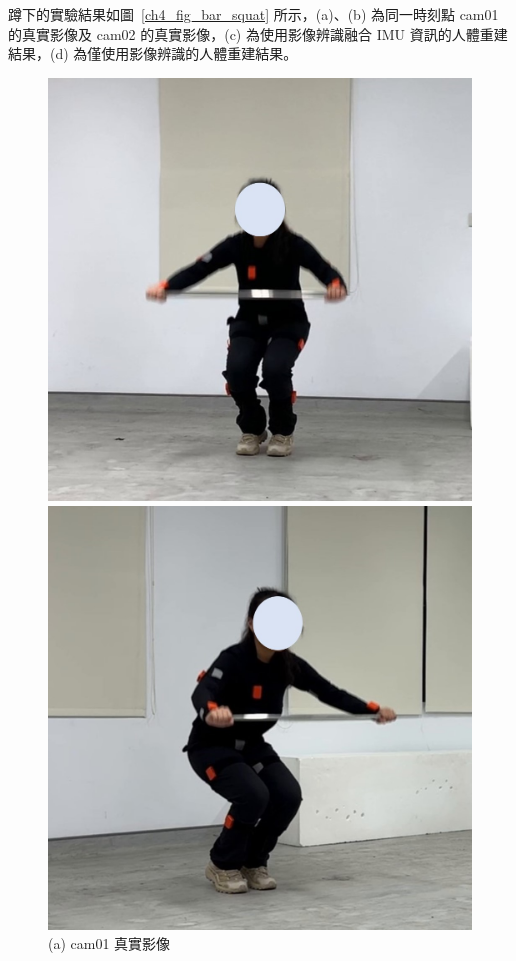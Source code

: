 \clearpage

蹲下的實驗結果如圖~\ref{ch4_fig_bar_squat} 所示，(a)、(b) 為同一時刻點 cam01 的真實影像及 cam02 的真實影像，(c) 為使用影像辨識融合 IMU 資訊的人體重建結果，(d) 為僅使用影像辨識的人體重建結果。

\begin{figure}[!ht]
   \centering
   \begin{minipage}{.5\textwidth}
      \centering
      \includegraphics[width=.95\linewidth]{figure/ch4_fig_bar_cam01_with2.jpg}
      \caption*{(a) cam01 真實影像}
    \end{minipage}%
    \begin{minipage}{.5\textwidth}
       \centering
       \includegraphics[width=.95\linewidth]{figure/ch4_fig_bar_cam02_with2.jpg}

\end{minipage}
\end{figure}
